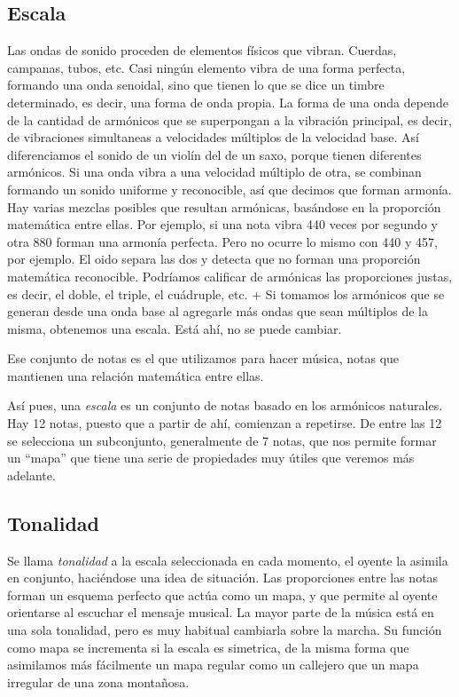 \documentclass[]{article}
\begin{document}
\subsection{Escala}

Las ondas de sonido proceden de elementos físicos que vibran. Cuerdas, campanas, tubos, etc. Casi ningún elemento vibra de una forma perfecta, formando una onda senoidal, sino que tienen lo que se dice un timbre determinado, es decir, una forma de onda propia. La forma de una onda depende de la cantidad de armónicos que se superpongan a la vibración principal, es decir, de vibraciones simultaneas a velocidades múltiplos de la velocidad base. Así diferenciamos el sonido de un violín del de un saxo, porque tienen diferentes armónicos. Si una onda vibra a una velocidad múltiplo de otra, se combinan formando un sonido uniforme y reconocible, así que decimos que forman armonía. Hay varias mezclas posibles que resultan armónicas, basándose en la proporción matemática entre ellas. Por ejemplo, si una nota vibra 440 veces por segundo y otra 880 forman una armonía perfecta. Pero no ocurre lo mismo con 440 y 457, por ejemplo. El oido separa las dos y detecta que no forman una proporción matemática reconocible. Podríamos calificar de armónicas las proporciones justas, es decir, el doble, el triple, el cuádruple, etc. + Si tomamos los armónicos que se generan desde una onda base al agregarle más ondas que sean múltiplos de la misma, obtenemos una escala. Está ahí, no se puede cambiar.

Ese conjunto de notas es el que utilizamos para hacer música, notas que mantienen una relación matemática entre ellas.

Así pues, una \emph{escala} es un conjunto de notas basado en los armónicos naturales. Hay 12 notas, puesto que a partir de ahí, comienzan a repetirse. De entre las 12 se selecciona un subconjunto, generalmente de 7 notas, que nos permite formar un ``mapa'' que tiene una serie de propiedades muy útiles que veremos más adelante.

\subsection{Tonalidad}

Se llama \emph{tonalidad} a la escala seleccionada en cada momento, el oyente la asimila en conjunto, haciéndose una idea de situación. Las proporciones entre las notas forman un esquema perfecto que actúa como un mapa, y que permite al oyente orientarse al escuchar el mensaje musical. La mayor parte de la música está en una sola tonalidad, pero es muy habitual cambiarla sobre la marcha. Su función como mapa se incrementa si la escala es simetrica, de la misma forma que asimilamos más fácilmente un mapa regular como un callejero que un mapa irregular de una zona montañosa.
\end{document}
